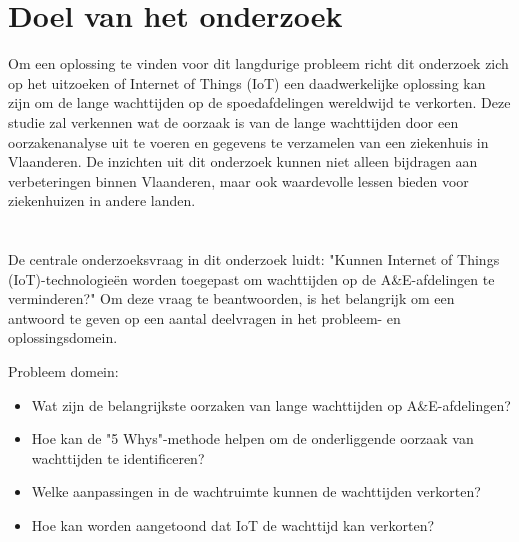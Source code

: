 
\section{Doel van het onderzoek}
Om een oplossing te vinden voor dit langdurige probleem richt dit onderzoek zich op het uitzoeken of Internet of Things (IoT) een daadwerkelijke oplossing kan zijn om de lange wachttijden op de spoedafdelingen wereldwijd te verkorten. Deze studie zal verkennen wat de oorzaak is van de lange wachttijden door een oorzakenanalyse uit te voeren en gegevens te verzamelen van een ziekenhuis in Vlaanderen. De inzichten uit dit onderzoek kunnen niet alleen bijdragen aan verbeteringen binnen Vlaanderen, maar ook waardevolle lessen bieden voor ziekenhuizen in andere landen.

\section{}%
\label{sec:onderzoeksvraag}
De centrale onderzoeksvraag in dit onderzoek luidt: "Kunnen Internet of Things (IoT)-\-technologieën worden toegepast om wachttijden op de A\&E-afdelingen te verminderen?" Om deze vraag te beantwoorden, is het belangrijk om een antwoord te geven op een aantal deelvragen in het probleem- en oplossingsdomein. 

Probleem domein:
\begin{itemize}
    \item Wat zijn de belangrijkste oorzaken van lange wachttijden op A\&E-afdelingen?
    \item Hoe kan de "5 Whys"-methode helpen om de onderliggende oorzaak van wachttijden te identificeren?
    \item Welke aanpassingen in de wachtruimte kunnen de wachttijden verkorten?
    \item Hoe kan worden aangetoond dat IoT de wachttijd kan verkorten?
\end{itemize}


